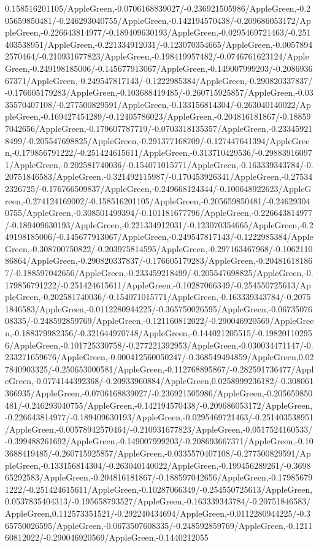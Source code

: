 {\begin{tikzternal}
{0.158516201105/AppleGreen,-0.0706168839027/-0.236921505986/AppleGreen,-0.205659850481/-0.246293040755/AppleGreen,-0.142194570438/-0.209686053172/AppleGreen,-0.226643814977/-0.189409630193/AppleGreen,-0.0295469721463/-0.251403538951/AppleGreen,-0.221334912031/-0.123070354665/AppleGreen,-0.00578942570464/-0.210931677823/AppleGreen,-0.198419957482/-0.0746761623124/AppleGreen,-0.249198185006/-0.145677913067/AppleGreen,-0.149007999203/-0.208693667371/AppleGreen,-0.249547817143/-0.1222985384/AppleGreen,-0.290820337837/-0.176605179283/AppleGreen,-0.103688419485/-0.260715925857/AppleGreen,-0.0335570407108/-0.277500829591/AppleGreen,-0.133156814304/-0.263040140022/AppleGreen,-0.169427454289/-0.12405786023/AppleGreen,-0.204816181867/-0.188597042656/AppleGreen,-0.179607787719/-0.0703318135357/AppleGreen,-0.233459218499/-0.205547698825/AppleGreen,-0.291377168709/-0.127447641394/AppleGreen,-0.179856791222/-0.251424615611/AppleGreen,-0.313710429536/-0.298839160971/AppleGreen,-0.202581740036/-0.154071015771/AppleGreen,-0.163339343784/-0.20751846583/AppleGreen,-0.321492115987/-0.170453926341/AppleGreen,-0.275342326725/-0.176766509837/AppleGreen,-0.249668124344/-0.100648922623/AppleGreen,-0.274124169002/-0.158516201105/AppleGreen,-0.205659850481/-0.246293040755/AppleGreen,-0.308501499394/-0.101181677796/AppleGreen,-0.226643814977/-0.189409630193/AppleGreen,-0.221334912031/-0.123070354665/AppleGreen,-0.249198185006/-0.145677913067/AppleGreen,-0.249547817143/-0.1222985384/AppleGreen,-0.308700750822/-0.203975814595/AppleGreen,-0.297163467968/-0.106211086864/AppleGreen,-0.290820337837/-0.176605179283/AppleGreen,-0.204816181867/-0.188597042656/AppleGreen,-0.233459218499/-0.205547698825/AppleGreen,-0.179856791222/-0.251424615611/AppleGreen,-0.10287066349/-0.254550725613/AppleGreen,-0.202581740036/-0.154071015771/AppleGreen,-0.163339343784/-0.20751846583/AppleGreen,-0.0112280944225/-0.365750026595/AppleGreen,-0.0673507608335/-0.248592859769/AppleGreen,-0.121160812022/-0.290046920569/AppleGreen,-0.188379982356/-0.321644970748/AppleGreen,-0.144021205515/-0.198201102956/AppleGreen,-0.101725330758/-0.277221392953/AppleGreen,-0.030034471147/-0.233271659676/AppleGreen,-0.000412560050247/-0.368549494859/AppleGreen,0.027840903325/-0.250653000581/AppleGreen,-0.112768895867/-0.282591736477/AppleGreen,-0.0774144392368/-0.20933960884/AppleGreen,0.0258999236182/-0.308061366935/AppleGreen,-0.0706168839027/-0.236921505986/AppleGreen,-0.205659850481/-0.246293040755/AppleGreen,-0.142194570438/-0.209686053172/AppleGreen,-0.226643814977/-0.189409630193/AppleGreen,-0.0295469721463/-0.251403538951/AppleGreen,-0.00578942570464/-0.210931677823/AppleGreen,-0.0517524160533/-0.399488261692/AppleGreen,-0.149007999203/-0.208693667371/AppleGreen,-0.103688419485/-0.260715925857/AppleGreen,-0.0335570407108/-0.277500829591/AppleGreen,-0.133156814304/-0.263040140022/AppleGreen,-0.199456289261/-0.369865292583/AppleGreen,-0.204816181867/-0.188597042656/AppleGreen,-0.179856791222/-0.251424615611/AppleGreen,-0.10287066349/-0.254550725613/AppleGreen,0.0537835404313/-0.195658793527/AppleGreen,-0.163339343784/-0.20751846583/AppleGreen,0.112573351521/-0.292240434694/AppleGreen,-0.0112280944225/-0.365750026595/AppleGreen,-0.0673507608335/-0.248592859769/AppleGreen,-0.121160812022/-0.290046920569/AppleGreen,-0.1440212055}
\end{tikzternal}}

